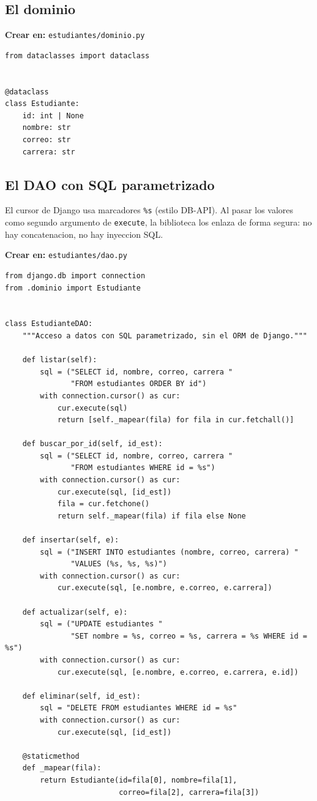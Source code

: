 \documentclass[11pt,a4paper,openany]{book}
\begin{document}
\subsection{El dominio}
\label{ap:crud:django:dominio}

{\small\textbf{Crear en:} \texttt{estudiantes/dominio.py}}
\begin{lstlisting}[style=python,caption={dominio.py (la clase Estudiante)},label={lst:dj-dominio}]
from dataclasses import dataclass


@dataclass
class Estudiante:
    id: int | None
    nombre: str
    correo: str
    carrera: str
\end{lstlisting}

\subsection{El DAO con SQL parametrizado}
\label{ap:crud:django:dao}

El cursor de Django usa marcadores \texttt{\%s} (estilo DB-API). Al
pasar los valores como segundo argumento de \texttt{execute}, la
biblioteca los enlaza de forma segura: no hay concatenacion, no hay
inyeccion SQL.

{\small\textbf{Crear en:} \texttt{estudiantes/dao.py}}
\begin{lstlisting}[style=python,caption={dao.py (CRUD con cursor, sin el ORM)},label={lst:dj-dao}]
from django.db import connection
from .dominio import Estudiante


class EstudianteDAO:
    """Acceso a datos con SQL parametrizado, sin el ORM de Django."""

    def listar(self):
        sql = ("SELECT id, nombre, correo, carrera "
               "FROM estudiantes ORDER BY id")
        with connection.cursor() as cur:
            cur.execute(sql)
            return [self._mapear(fila) for fila in cur.fetchall()]

    def buscar_por_id(self, id_est):
        sql = ("SELECT id, nombre, correo, carrera "
               "FROM estudiantes WHERE id = %s")
        with connection.cursor() as cur:
            cur.execute(sql, [id_est])
            fila = cur.fetchone()
            return self._mapear(fila) if fila else None

    def insertar(self, e):
        sql = ("INSERT INTO estudiantes (nombre, correo, carrera) "
               "VALUES (%s, %s, %s)")
        with connection.cursor() as cur:
            cur.execute(sql, [e.nombre, e.correo, e.carrera])

    def actualizar(self, e):
        sql = ("UPDATE estudiantes "
               "SET nombre = %s, correo = %s, carrera = %s WHERE id = %s")
        with connection.cursor() as cur:
            cur.execute(sql, [e.nombre, e.correo, e.carrera, e.id])

    def eliminar(self, id_est):
        sql = "DELETE FROM estudiantes WHERE id = %s"
        with connection.cursor() as cur:
            cur.execute(sql, [id_est])

    @staticmethod
    def _mapear(fila):
        return Estudiante(id=fila[0], nombre=fila[1],
                          correo=fila[2], carrera=fila[3])
\end{lstlisting}
\end{document}

